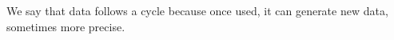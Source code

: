 
We say that data follows a cycle because once used, it can generate new data, sometimes more precise.





	

